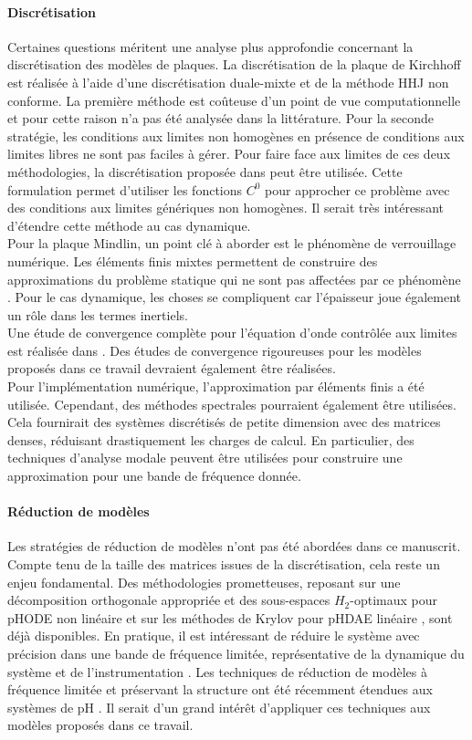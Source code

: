 \paragraph{Discrétisation}
Certaines questions méritent une analyse plus approfondie concernant la discrétisation des modèles de plaques. La discrétisation de la plaque de Kirchhoff est réalisée à l'aide d'une discrétisation duale-mixte et de la méthode HHJ non conforme. La première méthode est coûteuse d'un point de vue computationnelle et pour cette raison n'a pas été analysée dans la littérature. Pour la seconde stratégie, les conditions aux limites non homogènes en présence de conditions aux limites libres ne sont pas faciles à gérer. Pour faire face aux limites de ces deux méthodologies, la discrétisation proposée dans \cite{rafetseder2018siam} peut être utilisée. Cette formulation permet d'utiliser les fonctions $ C^0$ pour approcher ce problème avec des conditions aux limites génériques non homogènes. Il serait très intéressant d'étendre cette méthode au cas dynamique. \\ Pour la plaque Mindlin, un point clé à aborder est le phénomène de verrouillage numérique. Les éléments finis mixtes permettent de construire des approximations du problème statique qui ne sont pas affectées par ce phénomène \cite{veiga2013}. Pour le cas dynamique, les choses se compliquent car l'épaisseur joue également un rôle dans les termes inertiels. \\ Une étude de convergence complète pour l'équation d'onde contrôlée aux limites est réalisée dans \cite{haine2020numerical}. Des études de convergence rigoureuses pour les modèles proposés dans ce travail devraient également être réalisées. \\ Pour l'implémentation numérique, l'approximation par éléments finis a été utilisée. Cependant, des méthodes spectrales pourraient également être utilisées. Cela fournirait des systèmes discrétisés de petite dimension avec des matrices denses, réduisant drastiquement les charges de calcul. En particulier, des techniques d'analyse modale peuvent être utilisées pour construire une approximation pour une bande de fréquence donnée.

\paragraph{Réduction de modèles}
Les stratégies de réduction de modèles n'ont pas été abordées dans ce manuscrit. Compte tenu de la taille des matrices issues de la discrétisation, cela reste un enjeu fondamental. Des méthodologies prometteuses, reposant sur une décomposition orthogonale appropriée et des sous-espaces $H_2$-optimaux pour pHODE  non linéaire \cite{chaturantabut2016} et sur les méthodes de Krylov pour pHDAE linéaire \cite{egger2018}, sont déjà disponibles. En pratique, il est intéressant de réduire le système avec précision dans une bande de fréquence limitée, représentative de la dynamique du système et de l'instrumentation \cite{vuillemin2014frequency}. Les techniques de réduction de modèles à fréquence limitée et préservant la structure ont été récemment étendues aux systèmes de pH \cite{xu2020sp}. Il serait d'un grand intérêt d'appliquer ces techniques aux modèles proposés dans ce travail.

